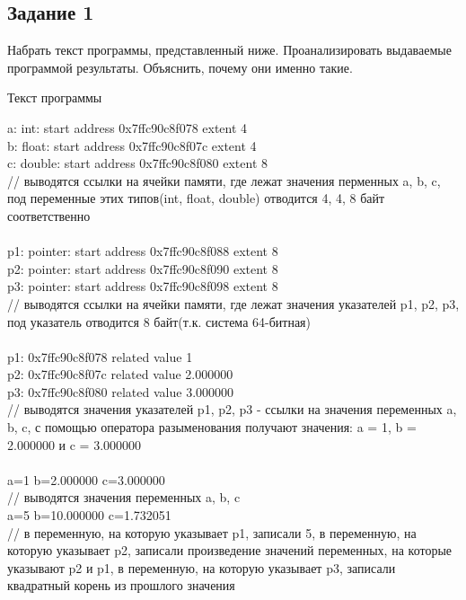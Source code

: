 \documentclass[a4paper,14pt]{extarticle}
\begin{document}
\subsection{Задание 1}
Набрать текст программы, представленный ниже. Проанализировать выдаваемые программой результаты. Объяснить, почему они именно такие.

\begin{center}
{\small Текст программы}
\end{center}
\begin{footnotesize}
a: int: start address 0x7ffc90c8f078   extent 4 \\
b: float: start address 0x7ffc90c8f07c   extent 4\\
c: double: start address 0x7ffc90c8f080   extent 8\\
// выводятся ссылки на ячейки памяти, где лежат значения перменных a, b, c, под переменные этих типов(int, float, double) отводится 4, 4, 8 байт соответственно\\
\\
p1: pointer: start address 0x7ffc90c8f088   extent 8\\
p2: pointer: start address 0x7ffc90c8f090   extent 8\\
p3: pointer: start address 0x7ffc90c8f098   extent 8\\
// выводятся ссылки на ячейки памяти, где лежат значения указателей p1, p2, p3, под указатель отводится 8 байт(т.к. система 64-битная)\\
\\
p1: 0x7ffc90c8f078 related value 1\\
p2: 0x7ffc90c8f07c related value 2.000000\\
p3: 0x7ffc90c8f080 related value 3.000000\\
// выводятся значения указателей p1, p2, p3 - ссылки на значения переменных a, b, c, с помощью оператора разыменования получают значения: a = 1, b = 2.000000 и c = 3.000000\\
\\
a=1	b=2.000000	c=3.000000\\
// выводятся значения переменных a, b, c\\
a=5	b=10.000000	c=1.732051\\
// в переменную, на которую указывает p1, записали 5, в переменную, на которую указывает p2, записали произведение значений переменных, на которые указывают p2 и p1, в переменную, на которую указывает p3, записали квадратный корень из прошлого значения\\

\end{footnotesize}
\end{document}

